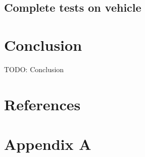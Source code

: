 \section{Complete tests on vehicle}

\chapter{Conclusion}

TODO: Conclusion



\chapter{References}

\printbibliography[heading=none,title={}]


\appendix
\renewcommand\chaptername{Appendix}

\renewcommand{\thechapter}{A}
\renewcommand\chaptername{Appendix A}

\chapter{Appendix A}


